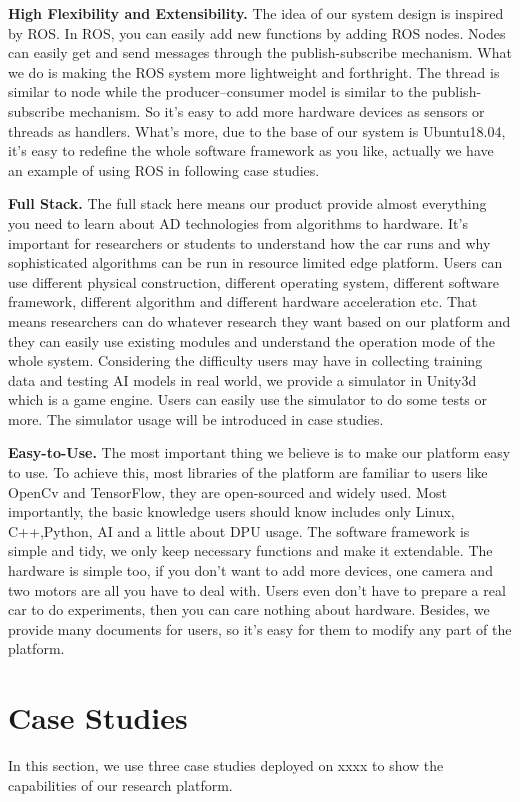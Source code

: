 \documentclass[conference]{IEEEtran}
\begin{document}
\begin{sloppypar}
\textbf{High Flexibility and Extensibility. }The idea of our system design is inspired by ROS. In ROS, you can easily add new functions by adding ROS nodes. Nodes can easily get and send messages through the publish-subscribe mechanism. What we do is making the ROS system more lightweight and forthright. The thread is similar to node while the producer–consumer model is similar to the publish-subscribe mechanism. So it's easy to add more hardware devices as sensors or threads as handlers. What's more, due to the base of our system is Ubuntu18.04, it's easy to redefine the whole software framework as you like, actually we have an example of using ROS in following case studies.

\textbf{Full Stack. }The full stack here means our product provide almost everything you need to learn about AD technologies from algorithms to hardware. It's important for researchers or students to understand how the car runs and why sophisticated algorithms can be run in resource limited edge platform. Users can use different physical construction, different operating system, different software framework, different algorithm and different hardware acceleration etc. That means researchers can do whatever research they want based on our platform and they can easily use existing modules and understand the operation mode of the whole system. Considering the difficulty users may have in collecting training data and testing AI models in real world, we provide a simulator in Unity3d which is a game engine. Users can easily use the simulator to do some tests or more. The simulator usage will be introduced in case studies.

\textbf{Easy-to-Use. }The most important thing we believe is to make our platform easy to use. To achieve this, most libraries of the platform are familiar to users like OpenCv and TensorFlow\cite{b33}, they are open-sourced and widely used. Most importantly, the basic knowledge users should know includes only Linux, C++,Python, AI and a little about DPU usage. The software framework is simple and tidy, we only keep necessary functions and make it extendable. The hardware is simple too, if you don't want to add more devices, one camera and two motors are all you have to deal with. Users even don't have to prepare a real car to do experiments, then you can care nothing about hardware. Besides, we provide many documents for users, so it's easy for them to modify any part of the platform.

\section{Case Studies}
In this section, we use three case studies deployed on xxxx to show the capabilities of our research platform.


\end{sloppypar}
\end{document}
